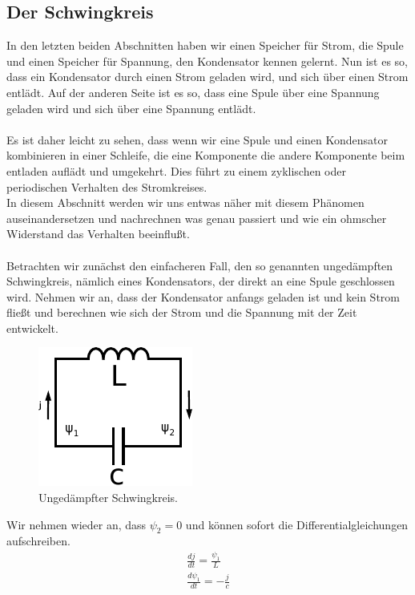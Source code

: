 \documentclass[11pt,a4paper,leqno]{report}
\numberwithin{equation}{chapter}
\begin{document}
\subsection{Der Schwingkreis}
In den letzten beiden Abschnitten haben wir einen Speicher f\"ur Strom, die Spule und einen Speicher f\"ur Spannung, den Kondensator kennen gelernt. Nun ist es so, dass ein Kondensator durch einen Strom geladen wird, und sich \"uber einen Strom entl\"adt. Auf der anderen Seite ist es so, dass eine Spule \"uber eine Spannung geladen wird und sich \"uber eine Spannung entl\"adt.\\
\\
Es ist daher leicht zu sehen, dass wenn wir eine Spule und einen Kondensator kombinieren in einer Schleife, die eine Komponente die andere Komponente beim entladen aufl\"adt und umgekehrt. Dies f\"uhrt zu einem zyklischen oder periodischen Verhalten des Stromkreises. \\
In diesem Abschnitt werden wir uns entwas n\"aher mit diesem Ph\"anomen auseinandersetzen und nachrechnen was genau passiert und wie ein ohmscher Widerstand das Verhalten beeinflu\ss{}t.\\
\\
Betrachten wir zun\"achst den einfacheren Fall, den so genannten unged\"ampften Schwingkreis, n\"amlich eines Kondensators, der direkt an eine Spule geschlossen wird. Nehmen wir an, dass der Kondensator anfangs geladen ist und kein Strom flie\ss{}t und berechnen wie sich der Strom und die Spannung mit der Zeit entwickelt.
\begin{figure}[H]
	\begin{center}
		\includegraphics[scale=1]{Bilder/schnwingkreis_ungedampft.pdf}
		\caption{Unged\"ampfter Schwingkreis.}
	\end{center}
\end{figure}
\noindent
Wir nehmen wieder an, dass $\psi_2=0$ und k\"onnen sofort die Differentialgleichungen aufschreiben.
 \begin{align} 
\frac{dj}{dt} = \frac{\psi_1}{L}\\
\frac{d\psi_1}{dt} = -\frac{j}{c}
\end{align}
\end{document}
